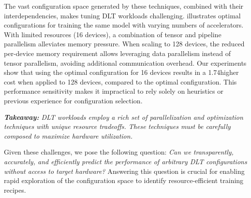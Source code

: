  The vast configuration space generated by these techniques, combined with their interdependencies, makes tuning DLT workloads challenging.  illustrates optimal configurations for training the same model with varying numbers of accelerators. With limited resources (16 devices), a combination of tensor and pipeline parallelism alleviates memory pressure. When scaling to 128 devices, the reduced per-device memory requirement allows leveraging data parallelism instead of tensor parallelism, avoiding additional communication overhead. Our experiments show that using the optimal configuration for 16 devices results in a 1.74\myx higher cost when applied to 128 devices, compared to the optimal configuration. This performance sensitivity makes it impractical to rely solely on heuristics or previous experience for configuration selection.

\textit{\textbf{Takeaway:} DLT workloads employ a rich set of parallelization and optimization techniques with unique resource tradeoffs. These techniques must be carefully composed to maximize hardware utilization.}





Given these challenges, we pose the following question: \textit{Can we transparently, accurately, and efficiently predict the performance of arbitrary DLT configurations without access to target hardware?} Answering this question is crucial for enabling rapid exploration of the configuration space to identify resource-efficient training recipes.







































































